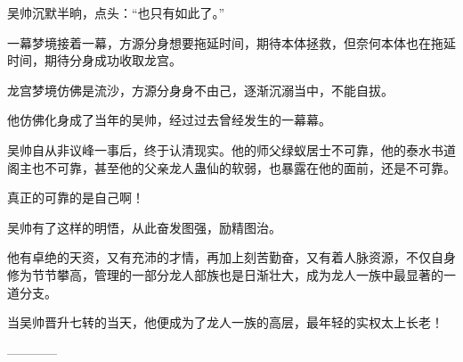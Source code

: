 \begin{this_body}
吴帅沉默半晌，点头：“也只有如此了。”

一幕梦境接着一幕，方源分身想要拖延时间，期待本体拯救，但奈何本体也在拖延时间，期待分身成功收取龙宫。

龙宫梦境仿佛是流沙，方源分身身不由己，逐渐沉溺当中，不能自拔。

他仿佛化身成了当年的吴帅，经过过去曾经发生的一幕幕。

吴帅自从非议峰一事后，终于认清现实。他的师父绿蚁居士不可靠，他的泰水书道阁主也不可靠，甚至他的父亲龙人蛊仙的软弱，也暴露在他的面前，还是不可靠。

真正的可靠的是自己啊！

吴帅有了这样的明悟，从此奋发图强，励精图治。

他有卓绝的天资，又有充沛的才情，再加上刻苦勤奋，又有着人脉资源，不仅自身修为节节攀高，管理的一部分龙人部族也是日渐壮大，成为龙人一族中最显著的一道分支。

当吴帅晋升七转的当天，他便成为了龙人一族的高层，最年轻的实权太上长老！

------------

\end{this_body}

